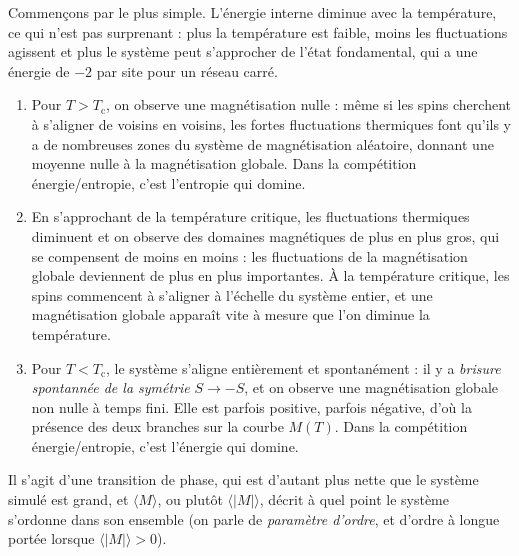 \documentclass{book}
\begin{document}
\begin{correction}
Commençons par le plus simple. L'énergie interne diminue avec la température, ce qui n'est pas surprenant : plus la température est faible, moins les fluctuations agissent et plus le système peut s'approcher de l'état fondamental, qui a une énergie de $-2$ par site pour un réseau carré.\\

\begin{enumerate}
\item Pour $T > T_\text{c}$, on observe une magnétisation nulle : même si les spins cherchent à s'aligner de voisins en voisins, les fortes fluctuations thermiques font qu'ils y a de nombreuses zones du système de magnétisation aléatoire, donnant une moyenne nulle à la magnétisation globale. Dans la compétition énergie/entropie, c'est l'entropie qui domine.

\item En s'approchant de la température critique, les fluctuations thermiques diminuent et on observe des domaines magnétiques de plus en plus gros, qui se compensent de moins en moins : les fluctuations de la magnétisation globale deviennent de plus en plus importantes. À la température critique, les spins commencent à s'aligner à l'échelle du système entier, et une magnétisation globale apparaît vite à mesure que l'on diminue la température.

\item Pour $T < T_\text{c}$, le système s'aligne entièrement et spontanément : il y a \emph{brisure spontannée de la symétrie} $S \to -S$, et on observe une magnétisation globale non nulle à temps fini. Elle est parfois positive, parfois négative, d'où la présence des deux branches sur la courbe $M(T)$. Dans la compétition énergie/entropie, c'est l'énergie qui domine.
\end{enumerate}

Il s'agit d'une transition de phase, qui est d'autant plus nette que le système simulé est grand, et $\langle M \rangle$, ou plutôt $\langle |M| \rangle$, décrit à quel point le système s'ordonne dans son ensemble (on parle de \emph{paramètre d'ordre}, et d'ordre à longue portée lorsque $\langle |M| \rangle > 0$).\\


\end{correction}
\end{document}
